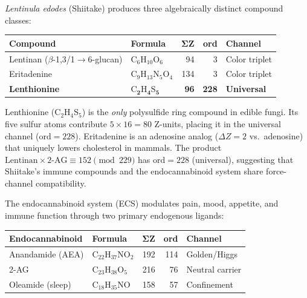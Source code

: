 \begin{result}
\label{res:shiitake_ecs}
\emph{Lentinula edodes} (Shiitake) produces three algebraically distinct
compound classes:

\begin{center}
\begin{tabular}{@{}llrrl@{}}
\toprule
\textbf{Compound} & \textbf{Formula} & $\boldsymbol{\Sigma Z}$ & \textbf{ord} & \textbf{Channel} \\
\midrule
Lentinan ($\beta$-1,3/1$\to$6-glucan) & $\mathrm{C}_6\mathrm{H}_{10}\mathrm{O}_6$ & 94 & 3 & Color triplet \\
Eritadenine & $\mathrm{C}_9\mathrm{H}_{13}\mathrm{N}_5\mathrm{O}_4$ & 134 & 3 & Color triplet \\
\textbf{Lenthionine} & $\boldsymbol{\mathrm{C}_2\mathrm{H}_4\mathrm{S}_5}$ & \textbf{96} & \textbf{228} & \textbf{Universal} \\
\bottomrule
\end{tabular}
\end{center}

Lenthionine ($\mathrm{C}_2\mathrm{H}_4\mathrm{S}_5$) is the \emph{only}
polysulfide ring compound in edible fungi. Its five sulfur atoms contribute
$5 \times 16 = 80$ Z-units, placing it in the universal channel ($\mathrm{ord} = 228$).
Eritadenine is an adenosine analog ($\Delta Z = 2$ vs.\ adenosine) that
uniquely lowers cholesterol in mammals. The product
$\text{Lentinan} \times \text{2-AG} \equiv 152 \pmod{229}$ has
$\mathrm{ord} = 228$ (universal), suggesting that Shiitake's immune
compounds and the endocannabinoid system share force-channel compatibility.
\end{result}

The endocannabinoid system (ECS) modulates pain, mood, appetite, and immune
function through two primary endogenous ligands:

\begin{center}
\begin{tabular}{@{}llrrl@{}}
\toprule
\textbf{Endocannabinoid} & \textbf{Formula} & $\boldsymbol{\Sigma Z}$ & \textbf{ord} & \textbf{Channel} \\
\midrule
Anandamide (AEA) & $\mathrm{C}_{22}\mathrm{H}_{37}\mathrm{NO}_2$ & 192 & 114 & Golden/Higgs \\
2-AG & $\mathrm{C}_{23}\mathrm{H}_{38}\mathrm{O}_5$ & 216 & 76 & Neutral carrier \\
Oleamide (sleep) & $\mathrm{C}_{18}\mathrm{H}_{35}\mathrm{NO}$ & 158 & 57 & Confinement \\
\bottomrule
\end{tabular}
\end{center}

